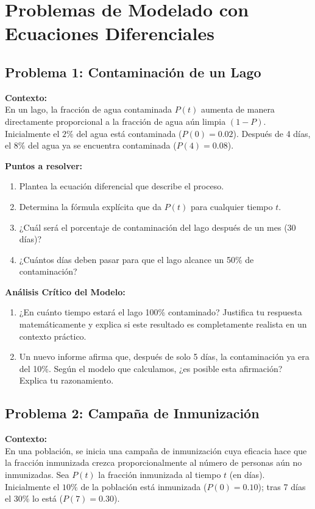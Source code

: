 \documentclass[12pt,a4paper]{article}
\begin{document}
\section*{Problemas de Modelado con Ecuaciones Diferenciales}

\subsection*{Problema 1: Contaminación de un Lago}
\textbf{Contexto:}
\\
En un lago, la fracción de agua contaminada $P(t)$ aumenta de manera directamente proporcional a la fracción de agua aún limpia $(1-P)$. Inicialmente el $2\%$ del agua está contaminada ($P(0) = 0.02$). Después de 4 días, el $8\%$ del agua ya se encuentra contaminada ($P(4) = 0.08$).

\textbf{Puntos a resolver:}
\begin{enumerate}[label=\textbf{\Alph*.},leftmargin=2em]
    \item Plantea la ecuación diferencial que describe el proceso.
    \item Determina la fórmula explícita que da $P(t)$ para cualquier tiempo $t$.
    \item ¿Cuál será el porcentaje de contaminación del lago después de un mes (30 días)?
    \item ¿Cuántos días deben pasar para que el lago alcance un 50\% de contaminación?
\end{enumerate}

\textbf{Análisis Crítico del Modelo:}
\begin{enumerate}[label=\textbf{E\arabic*.},leftmargin=2em]
    \item ¿En cuánto tiempo estará el lago 100\% contaminado? Justifica tu respuesta matemáticamente y explica si este resultado es completamente realista en un contexto práctico.
    \item Un nuevo informe afirma que, después de solo 5 días, la contaminación ya era del 10\%. Según el modelo que calculamos, ¿es posible esta afirmación? Explica tu razonamiento.
\end{enumerate}

\subsection*{Problema 2: Campaña de Inmunización}
\textbf{Contexto:}
\\
En una población, se inicia una campaña de inmunización cuya eficacia hace que la fracción inmunizada crezca proporcionalmente al número de personas aún no inmunizadas. Sea $P(t)$ la fracción inmunizada al tiempo $t$ (en días). Inicialmente el $10\%$ de la población está inmunizada ($P(0) = 0.10$); tras 7 días el $30\%$ lo está ($P(7) = 0.30$).
\end{document}
